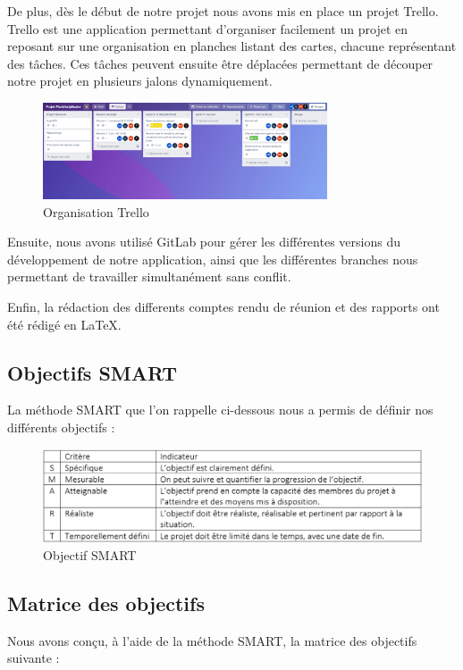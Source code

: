 \documentclass[french,a4paper]{article}
\begin{document}
De plus, dès le début de notre projet nous avons mis en place un projet Trello. Trello est une application permettant d’organiser facilement un projet en reposant sur une organisation en planches listant des cartes, chacune représentant des tâches. Ces tâches peuvent ensuite être déplacées permettant de découper notre projet en plusieurs jalons dynamiquement.
\begin{figure}[H]
    \centering
    \includegraphics[width=0.75\textwidth]{img/trello.png}
    \caption{Organisation Trello}
\end{figure}

Ensuite, nous avons utilisé GitLab pour gérer les différentes versions du développement de notre application, ainsi que les différentes branches nous permettant de travailler simultanément sans conflit.

Enfin, la rédaction des differents comptes rendu de réunion et des rapports ont été rédigé en \LaTeX.

\subsection{Objectifs SMART}
La méthode SMART que l'on rappelle ci-dessous nous a permis de définir nos différents objectifs :

\begin{figure}[H]
    \centering
    \includegraphics[width=1\textwidth]{img/SMART.png}
    \caption{Objectif SMART}
\end{figure}

\subsection{Matrice des objectifs}
Nous avons conçu, à l'aide de la méthode SMART, la matrice des objectifs suivante :
\end{document}
